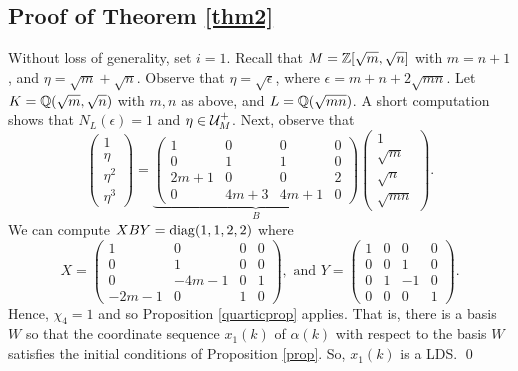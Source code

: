 \documentclass[11pt]{amsart}
\begin{document}
\subsection*{Proof of Theorem \ref{thm2}} Without loss of generality, set $i=1$. Recall that $M=\mathbb{Z}[\sqrt{m}, \sqrt{n}]$ with $m=n+1$, and $\eta=\sqrt{m}+\sqrt{n}$. 
Observe that $\eta=\sqrt{\epsilon}$, where $\epsilon=m+n+2\sqrt{mn}$. Let $K=\mathbb{Q}(\sqrt{m}, \sqrt{n})$ with $m, n$ as above, and $L=\mathbb{Q}(\sqrt{mn})$.  A short computation shows that $N_L(\epsilon)=1$ and $\eta \in \mathcal{U}_M^+$. Next, observe that
\[\begin{pmatrix} 1 \\ \eta \\ \eta^2 \\ \eta^3 \end{pmatrix}=\underbrace{\begin{pmatrix} 1 & 0 & 0 & 0 \\ 0 & 1 & 1 & 0 \\ 2m+1 & 0 & 0 & 2 \\ 0 & 4m+3 & 4m+1 & 0 \end{pmatrix}}_{B} \begin{pmatrix} 1 \\ \sqrt{m} \\ \sqrt{n} \\ \sqrt{mn} \end{pmatrix}.\]
We can compute $XBY=\operatorname{diag}(1, 1, 2, 2)$ where
\[X=\begin{pmatrix} 1 & 0 & 0 & 0 \\ 0 & 1 & 0 & 0 \\ 0 & -4m-1 & 0 & 1 \\ -2m-1 & 0 & 1 & 0 \end{pmatrix},
\text{ and }
Y= \begin{pmatrix} 1 & 0 & 0 & 0 \\ 0 & 0 & 1 & 0 \\ 0 & 1 & -1 & 0 \\ 0 & 0 & 0 & 1 \end{pmatrix}.
\]
Hence, $\chi_4=1$ and so Proposition \ref{quarticprop} applies. That is, there is a basis $W$ so that the coordinate sequence $x_1(k)$ of $\alpha(k)$ with respect to the basis $W$ satisfies the initial conditions of Proposition \ref{prop}. So, $x_1(k)$ is a LDS.  \hfill \qed 
\end{document}
